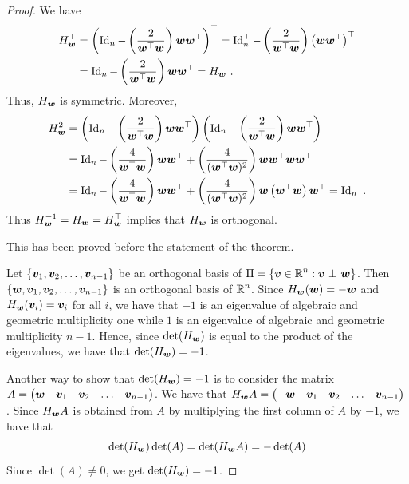 \begin{proof}
 We have
\begin{align*}
  H_{\bm{w}}^\top &=
\left(\operatorname{Id}_n - \left(\frac{2}{\bm{w}^\top \bm{w}}\right)
  \bm{w} \bm{w}^\top \right)^\top
= \operatorname{Id}_n^\top - \left(\frac{2}{\bm{w}^\top \bm{w}}\right)
  \left( \bm{w} \bm{w}^\top \right)^\top \\
&=\operatorname{Id}_n - \left(\frac{2}{\bm{w}^\top \bm{w}}\right)
\bm{w} \bm{w}^\top = H_{\bm{w}} \ .
\end{align*}
Thus, $H_{\bm{w}}$ is symmetric.  Moreover,
\begin{align*}
H_{\bm{w}}^2 &= \left(\operatorname{Id}_n - \left(\frac{2}{\bm{w}^\top \bm{w}}\right)
\bm{w} \bm{w}^\top \right)
\left(\operatorname{Id}_n - \left(\frac{2}{\bm{w}^\top \bm{w}}\right)
  \bm{w} \bm{w}^\top \right) \\                
&= \operatorname{Id}_n - \left(\frac{4}{\bm{w}^\top \bm{w}}\right) \bm{w} \bm{w}^\top
+ \left(\frac{4}{(\bm{w}^\top \bm{w})^2}\right) \bm{w} \bm{w}^\top
\bm{w} \bm{w}^\top \\
&= \operatorname{Id}_n - \left(\frac{4}{\bm{w}^\top \bm{w}}\right) \bm{w} \bm{w}^\top
+ \left(\frac{4}{(\bm{w}^\top \bm{w})^2}\right)
\bm{w} \left( \bm{w}^\top \bm{w} \right) \bm{w}^\top = \operatorname{Id}_n \ .
\end{align*}
Thus $\displaystyle H_{\bm{w}}^{-1} = H_{\bm{w}} = H_{\bm{w}}^\top$ implies that
$H_{\bm{w}}$ is orthogonal.

  This has been proved before the statement of the theorem.

 Let $\{\bm{v}_1, \bm{v}_2, \ldots, \bm{v}_{n-1}\}$ be an
orthogonal basis of
$\displaystyle \Pi = \{ \bm{v} \in \mathbb{R}^n : \bm{v} \operatorname{\,\bot\,} \bm{w}\}$.  Then \\
$\{\bm{w}, \bm{v}_1, \bm{v}_2, \ldots, \bm{v}_{n-1}\}$ is an
orthogonal basis of $\displaystyle \mathbb{R}^n$.  Since
$H_{\bm{w}}(\bm{w}) = -\bm{w}$
and $H_{\bm{w}}(\bm{v}_i) = \bm{v}_i$ for all $i$, we have that
$-1$ is an eigenvalue of algebraic and geometric multiplicity one
while $1$ is an eigenvalue of algebraic and geometric multiplicity
$n-1$.  Hence, since $\det(H_{\bm{w}})$ is equal to the product of the
eigenvalues, we have that $\det(H_{\bm{w}}) = -1$.

Another way to show that $\det(H_{\bm{w}}) = -1$ is to consider the
\nn matrix\\
$\displaystyle A = \begin{pmatrix} \bm{w} & \bm{v}_1 & \bm{v}_2 &
\ldots & \bm{v}_{n-1} \end{pmatrix}$.   We have that
$\displaystyle H_{\bm{w}} A = \begin{pmatrix} -\bm{w} & \bm{v}_1 & \bm{v}_2 &
\ldots & \bm{v}_{n-1} \end{pmatrix}$.   Since $H_{\bm{w}} A$ is
obtained from $A$ by multiplying the first column of $A$ by $-1$,
we have that
\[
\det(H_{\bm{w}}) \det(A) = \det(H_{\bm{w}} A) =  -\det(A)  
\]
Since $\det(A) \neq 0$, we get $\det(H_{\bm{w}}) = -1$.


\end{proof}
